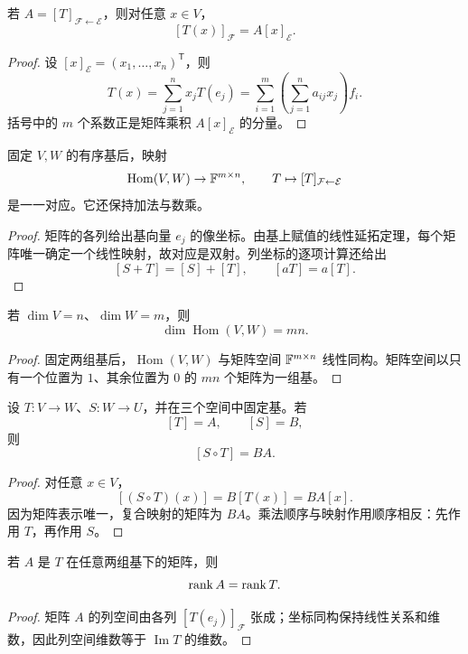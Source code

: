\begin{theorem}[坐标作用公式]
若 $A=[T]_{\mathcal F\leftarrow\mathcal E}$，则对任意 $x\in V$，
\[
[T(x)]_{\mathcal F}=A[x]_{\mathcal E}.
\]
\end{theorem}
\begin{proof}
设 $[x]_{\mathcal E}=(x_1,\ldots,x_n)^{\mathsf T}$，则
\[
T(x)=\sum_{j=1}^n x_jT(e_j)
=\sum_{i=1}^m\left(\sum_{j=1}^n a_{ij}x_j\right)f_i.
\]
括号中的 $m$ 个系数正是矩阵乘积 $A[x]_{\mathcal E}$ 的分量。
\end{proof}

\begin{theorem}[矩阵与线性映射的一一对应]
固定 $V,W$ 的有序基后，映射
\[
\operatorname{Hom}(V,W)\to\mathbb{F}^{m\times n},
\qquad
T\mapsto[T]_{\mathcal F\leftarrow\mathcal E}
\]
是一一对应。它还保持加法与数乘。
\end{theorem}
\begin{proof}
矩阵的各列给出基向量 $e_j$ 的像坐标。由基上赋值的线性延拓定理，每个矩阵唯一确定一个线性映射，故对应是双射。列坐标的逐项计算还给出
\[
[S+T]=[S]+[T],\qquad [aT]=a[T].
\]
\end{proof}

\begin{corollary}[线性映射空间的维数]
若 $\dim V=n$、$\dim W=m$，则
\[
\dim\operatorname{Hom}(V,W)=mn.
\]
\end{corollary}
\begin{proof}
固定两组基后，$\operatorname{Hom}(V,W)$ 与矩阵空间 $\mathbb{F}^{m\times n}$ 线性同构。矩阵空间以只有一个位置为 $1$、其余位置为 $0$ 的 $mn$ 个矩阵为一组基。
\end{proof}

\begin{theorem}[复合映射的矩阵]
设 $T:V\to W$、$S:W\to U$，并在三个空间中固定基。若
\[
[T]=A,\qquad [S]=B,
\]
则
\[
[S\circ T]=BA.
\]
\end{theorem}
\begin{proof}
对任意 $x\in V$，
\[
[(S\circ T)(x)]
=B[T(x)]=BA[x].
\]
因为矩阵表示唯一，复合映射的矩阵为 $BA$。乘法顺序与映射作用顺序相反：先作用 $T$，再作用 $S$。
\end{proof}

\begin{corollary}[矩阵秩等于线性映射的秩]
若 $A$ 是 $T$ 在任意两组基下的矩阵，则
\[
\operatorname{rank} A=\operatorname{rank} T.
\]
\end{corollary}
\begin{proof}
矩阵 $A$ 的列空间由各列 $[T(e_j)]_{\mathcal F}$ 张成；坐标同构保持线性关系和维数，因此列空间维数等于 $\operatorname{Im}T$ 的维数。
\end{proof}

